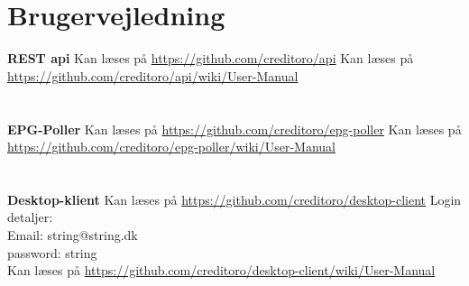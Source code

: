 \section{Brugervejledning}

{\large\textbf{REST api}}
Kan læses på \url{https://github.com/creditoro/api}
Kan læses på \url{https://github.com/creditoro/api/wiki/User-Manual}\\ \\ \\



{\large\textbf{EPG-Poller}}
Kan læses på \url{https://github.com/creditoro/epg-poller}
Kan læses på \url{https://github.com/creditoro/epg-poller/wiki/User-Manual}\\ \\ \\



{\large\textbf{Desktop-klient}}
Kan læses på \url{https://github.com/creditoro/desktop-client}
Login detaljer:\\
Email: string@string.dk\\
password: string\\

Kan læses på \url{https://github.com/creditoro/desktop-client/wiki/User-Manual}